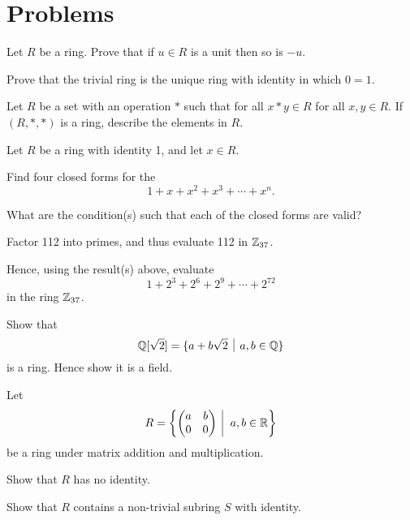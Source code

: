 \newpage

\section{Problems}
\begin{problem}
    Let $R$ be a ring. Prove that if $u \in R$ is a unit then so is $-u$.
\end{problem}

\begin{problem}
    Prove that the trivial ring is the unique ring with identity in which $0 = 1$.
\end{problem}

\begin{problem}
    Let $R$ be a set with an operation $\ast$ such that for all $x \ast y \in R$ for all $x, y \in R$. If $(R, \ast, \ast)$ is a ring, describe the elements in $R$.
\end{problem}

\begin{problem}
    Let $R$ be a ring with identity 1, and let $x \in R$.
    \begin{partquestions}{\roman*}
        \item Find four closed forms for the 
        \[
            1 + x + x^2 + x^3 + \cdots + x^n.
        \]
        \item What are the condition(s) such that each of the closed forms are valid?
        \item Factor 112 into primes, and thus evaluate 112 in $\mathbb{Z}_{37}$.
        \item Hence, using the result(s) above, evaluate
        \[
            1 + 2^3 + 2^6 + 2^9 + \cdots + 2^{72}
        \]
        in the ring $\mathbb{Z}_{37}$.
    \end{partquestions}
\end{problem}

\begin{problem}
    Show that
    \[
        \Q[\sqrt2] = \{a + b\sqrt2 \vert a,b \in \Q\}
    \]
    is a ring. Hence show it is a field.
\end{problem}

\begin{problem}
    Let
    \[
        R = \left\{\begin{pmatrix}a&b\\0&0\end{pmatrix} \vert a,b \in \R\right\}
    \]
    be a ring under matrix addition and multiplication.
    \begin{partquestions}{\roman*}
        \item Show that $R$ has no identity.
        \item Show that $R$ contains a non-trivial subring $S$ with identity.
    \end{partquestions}
\end{problem}

